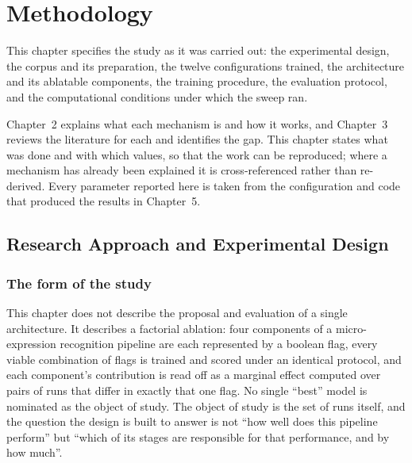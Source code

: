 %
%

\chapter{Methodology}
\label{ch:methodology}

This chapter specifies the study as it was carried out: the experimental design, the corpus and its preparation, the twelve configurations trained, the architecture and its ablatable components, the training procedure, the evaluation protocol, and the computational conditions under which the sweep ran.

Chapter~2 explains what each mechanism is and how it works, and Chapter~3 reviews the literature for each and identifies the gap. This chapter states what was done and with which values, so that the work can be reproduced; where a mechanism has already been explained it is cross-referenced rather than re-derived. Every parameter reported here is taken from the configuration and code that produced the results in Chapter~5.


\section{Research Approach and Experimental Design}
\label{sec:research-approach}

\subsection{The form of the study}
\label{sec:study-form}

This chapter does not describe the proposal and evaluation of a single architecture. It describes a factorial ablation: four components of a micro-expression recognition pipeline are each represented by a boolean flag, every viable combination of flags is trained and scored under an identical protocol, and each component's contribution is read off as a marginal effect computed over pairs of runs that differ in exactly that one flag. No single ``best'' model is nominated as the object of study. The object of study is the set of runs itself, and the question the design is built to answer is not ``how well does this pipeline perform'' but ``which of its stages are responsible for that performance, and by how much''.

